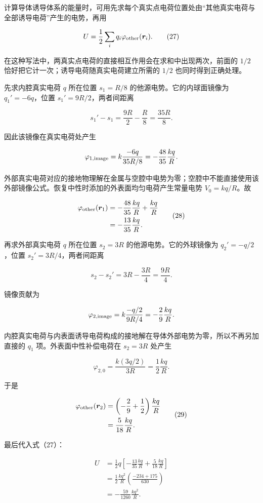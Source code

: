 \documentclass[12pt,a4paper,UTF8]{ctexart}
\begin{document}
计算导体诱导体系的能量时，可用先求每个真实点电荷位置处由``其他真实电荷与全部诱导电荷''产生的电势，再用

\[
U=\frac12\sum_i q_i\varphi_{\rm other}(\boldsymbol r_i).
\tag{27}
\]

在这种写法中，两真实点电荷的直接相互作用会在求和中出现两次，前面的
\(1/2\) 恰好把它计一次；诱导电荷随真实电荷建立所需的 \(1/2\)
也同时得到正确处理。

先求内腔真实电荷 \(q\) 所在位置 \(s_1=R/8\) 的他源电势。它的内球面镜像为
\(q_1'=-6q\)，位置 \(s_1'=9R/2\)，两者间距离

\[
s_1'-s_1
=\frac{9R}{2}-\frac R8
=\frac{35R}{8}.
\]

因此该镜像在真实电荷处产生

\[
\varphi_{1,\rm image}
=k\frac{-6q}{35R/8}
=-\frac{48}{35}\frac{kq}{R}.
\]

外部真实电荷对应的接地物理解在金属与空腔中电势为零；空腔中不能直接使用该外部镜像公式。恢复中性时添加的外表面均匀电荷产生常量电势
\(V_0=kq/R\)。故

\[
\begin{aligned}
\varphi_{\rm other}(\boldsymbol r_1)
&=-\frac{48}{35}\frac{kq}{R}
+\frac{kq}{R}\\
&=-\frac{13}{35}\frac{kq}{R}.
\end{aligned}
\tag{28}
\]

再求外部真实电荷 \(q\) 所在位置 \(s_2=3R\) 的他源电势。它的外球镜像为
\(q_2'=-q/2\)，位置 \(s_2'=3R/4\)，两者间距离

\[
s_2-s_2'
=3R-\frac{3R}{4}
=\frac{9R}{4}.
\]

镜像贡献为

\[
\varphi_{2,\rm image}
=k\frac{-q/2}{9R/4}
=-\frac29\frac{kq}{R}.
\]

内腔真实电荷与内表面诱导电荷构成的接地解在导体外部电势为零，所以不再另加直接的
\(q_1\) 项。外表面中性补偿电荷在 \(s_2=3R\) 处产生

\[
\varphi_{2,0}
=\frac{k(3q/2)}{3R}
=\frac12\frac{kq}{R}.
\]

于是

\[
\begin{aligned}
\varphi_{\rm other}(\boldsymbol r_2)
&=\left(-\frac29+\frac12\right)\frac{kq}{R}\\
&=\frac5{18}\frac{kq}{R}.
\end{aligned}
\tag{29}
\]

最后代入式（27）：

\[
\begin{aligned}
U
&=\frac12q\left[
-\frac{13}{35}\frac{kq}{R}
+\frac5{18}\frac{kq}{R}
\right]\\
&=\frac12\frac{kq^2}{R}
\left(\frac{-234+175}{630}\right)\\
&=\boxed{-\frac{59}{1260}\frac{kq^2}{R}}.
\end{aligned}
\tag{30}
\]
\end{document}
